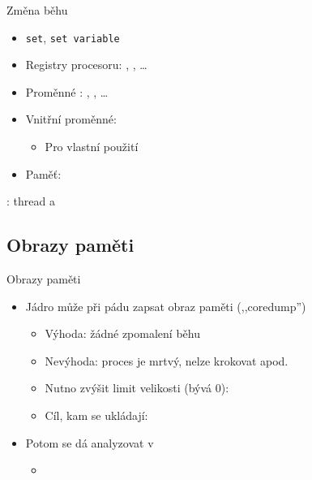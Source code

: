 \begin{frame}{Změna běhu}

  \begin{itemize}
    \item \texttt{set}, \texttt{set variable}

    \pause

    \item Registry procesoru: , , \dots

    \pause

    \item Proměnné : , , \dots
    \item Vnitřní proměnné: 
    \begin{itemize}
      \item Pro vlastní použití
    \end{itemize}

    \pause

    \item Paměť: 
  \end{itemize}

  \pause
  \medskip

  : thread a 

\end{frame}

\iffimuni
\subsection{Obrazy paměti}
\fi

\begin{frame}{Obrazy paměti}

  \begin{itemize}
    \item Jádro může při pádu zapsat obraz paměti (,,coredump'')
    \begin{itemize}
      \item Výhoda: žádné zpomalení běhu
      \item Nevýhoda: proces je mrtvý, nelze krokovat apod.

      \pause

      \item Nutno zvýšit limit velikosti (bývá 0): 
      \item Cíl, kam se ukládají: 
    \end{itemize}

    \pause

    \item Potom se dá analyzovat v 
    \begin{itemize}
      \item {}
    \end{itemize}
  \end{itemize}

\end{frame}

